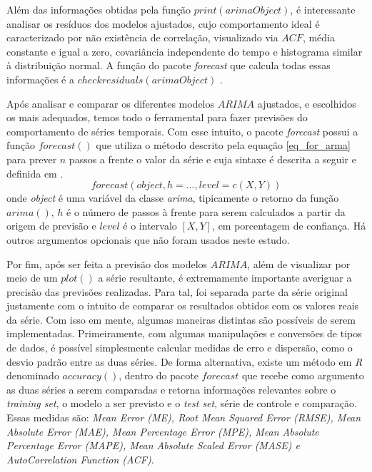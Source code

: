 \documentclass[12pt]{article}
\begin{document}
Além das informações obtidas pela função $print(arimaObject)$, é interessante analisar os resíduos dos modelos ajustados, cujo comportamento ideal é caracterizado por não existência de correlação, visualizado via $ACF$, média constante e igual a zero, covariância independente do tempo e histograma similar à distribuição normal. A função do pacote \emph{forecast} que calcula todas essas informações é a $checkresiduals(arimaObject)$ \cite{CRANR}.

Após analisar e comparar os diferentes modelos $ARIMA$ ajustados, e escolhidos os mais adequados, temos todo o ferramental para fazer previsões do comportamento de séries temporais. Com esse intuito, o pacote \emph{forecast} possui a função $forecast()$ que utiliza o método descrito pela equação \ref{eq_for_arma} para prever $n$ passos a frente o valor da série e cuja sintaxe é descrita a seguir e definida em \cite{CRANR}.
\begin{equation*}
forecast(object, h = ...,level=c(X,Y))
\end{equation*}
onde \textit{object} é uma variável da classe \textit{arima}, tipicamente o retorno da função $arima()$, $h$ é o número de passos à frente para serem calculados a partir da origem de previsão e $level$ é o intervalo $[X,Y]$, em porcentagem de confiança. Há outros argumentos opcionais que não foram usados neste estudo. 

Por fim, após ser feita a previsão dos modelos $ARIMA$, além de visualizar por meio de um $plot()$ a série resultante, é extremamente importante averiguar a precisão das previsões realizadas. Para tal, foi separada parte da série original justamente com o intuito de comparar os resultados obtidos com os valores reais da série. Com isso em mente, algumas maneiras distintas são possíveis de serem implementadas. Primeiramente, com algumas manipulações e conversões de tipos de dados, é possível simplesmente calcular medidas de erro e dispersão, como o  desvio padrão entre as duas séries. De forma alternativa, existe um método em \emph{R} denominado $accuracy()$, dentro do pacote $forecast$ \cite{CRANR} que recebe como argumento as duas séries a serem comparadas e retorna informações relevantes sobre o \textit{training set}, o modelo a ser previsto e o \textit{test set}, série de controle e comparação. Essas medidas são: \textit{Mean Error (ME), Root Mean Squared Error (RMSE), Mean Absolute Error (MAE), Mean Percentage Error (MPE), Mean Absolute Percentage Error (MAPE), Mean Absolute Scaled Error (MASE) e AutoCorrelation Function (ACF)}.
\end{document}
